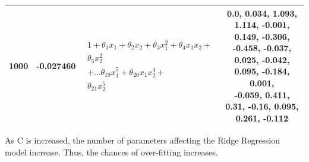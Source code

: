 \documentclass[10pt]{article}
\begin{document}
\begin{table}[H]
\begin{center}
\begin{tabular}{ |c|c|c|c| }
      \hline
      1000 & -0.027460 & $\begin{aligned}1 + \theta_{1}x_{1} + \theta_{2}x_{2} + \theta_{3}x_{1}^{2}+ \theta_{4}x_{1}x_{2}+\\\nonumber \theta_{5}x_{2}^{2}\\\nonumber+\dots \theta_{19}x_{1}^{5}+ \theta_{20}x_{1}x_{2}^{4}+ \\\nonumber \theta_{21}x_{2}^{5}\end{aligned}$ & \makecell{0.0, 0.034, 1.093, 1.114, -0.001, 0.149, -0.306, \\-0.458, -0.037, 0.025, -0.042, 0.095, -0.184, 0.001, \\-0.059, 0.411, 0.31, -0.16, 0.095, 0.261, -0.112} \\
      \hline
    \end{tabular}
  \end{center}
\end{table}

As C is increased, the number of parameters affecting the Ridge Regression model increase. Thus, the chances of over-fitting increases.
\end{document}
